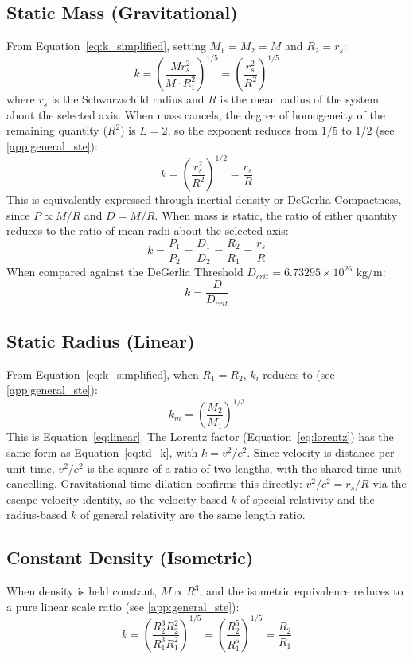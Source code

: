\documentclass[twoside,twocolumn,9pt]{article}
\begin{document}
\subsection{Static Mass (Gravitational)}
From Equation~\ref{eq:k_simplified}, setting $M_1 = M_2 = M$ and $R_2 = r_s$:
\begin{equation}
k = \left(\frac{M r_s^2}{M \cdot R_1^2}\right)^{1/5} = \left(\frac{r_s^2}{R^2}\right)^{1/5}
\end{equation}
where $r_s$ is the Schwarzschild radius and $R$ is the mean radius of the system about the selected axis. When mass cancels, the degree of homogeneity of the remaining quantity ($R^2$) is $L = 2$, so the exponent reduces from $1/5$ to $1/2$ (see \ref{app:general_ste}):
\begin{equation}
k = \left(\frac{r_s^2}{R^2}\right)^{1/2} = \frac{r_s}{R}
\end{equation}
This is equivalently expressed through inertial density or DeGerlia Compactness, since $P \propto M/R$ and $D = M/R$. When mass is static, the ratio of either quantity reduces to the ratio of mean radii about the selected axis:
\begin{equation}
k = \frac{P_1}{P_2} = \frac{D_1}{D_2} = \frac{R_2}{R_1} = \frac{r_s}{R}
\end{equation}
When compared against the DeGerlia Threshold $D_{crit} = 6.73295 \times 10^{26}$ kg/m:
\begin{equation}
k = \frac{D}{D_{crit}}
\end{equation}

\subsection{Static Radius (Linear)}
From Equation~\ref{eq:k_simplified}, when $R_1 = R_2$, $k_i$ reduces to (see \ref{app:general_ste}):
\begin{equation}
k_m = \left(\frac{M_2}{M_1}\right)^{1/3}
\end{equation}
This is Equation~\ref{eq:linear}. The Lorentz factor (Equation~\ref{eq:lorentz}) has the same form as Equation~\ref{eq:td_k}, with $k = v^2/c^2$. Since velocity is distance per unit time, $v^2/c^2$ is the square of a ratio of two lengths, with the shared time unit cancelling. Gravitational time dilation confirms this directly: $v^2/c^2 = r_s/R$ via the escape velocity identity, so the velocity-based $k$ of special relativity and the radius-based $k$ of general relativity are the same length ratio.

\subsection{Constant Density (Isometric)}
When density is held constant, $M \propto R^3$, and the isometric equivalence reduces to a pure linear scale ratio (see \ref{app:general_ste}):
\begin{equation}
k = \left(\frac{R_2^3 R_2^2}{R_1^3 R_1^2}\right)^{1/5} = \left(\frac{R_2^5}{R_1^5}\right)^{1/5} = \frac{R_2}{R_1}
\end{equation}
\end{document}
